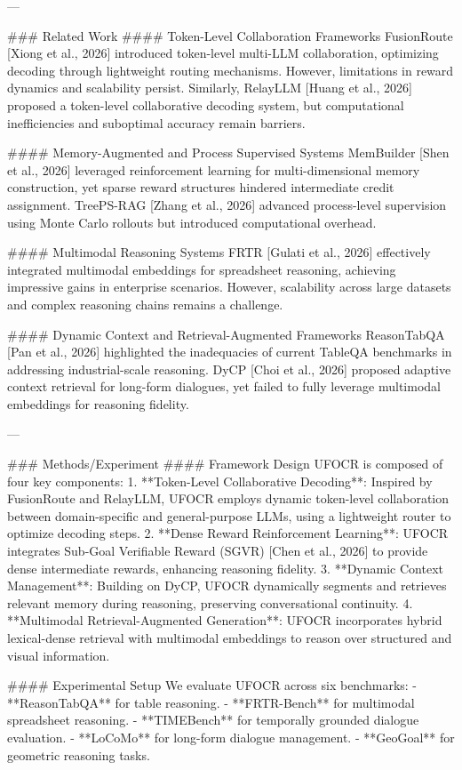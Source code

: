 ---

### Related Work
#### Token-Level Collaboration Frameworks
FusionRoute [Xiong et al., 2026] introduced token-level multi-LLM collaboration, optimizing decoding through lightweight routing mechanisms. However, limitations in reward dynamics and scalability persist. Similarly, RelayLLM [Huang et al., 2026] proposed a token-level collaborative decoding system, but computational inefficiencies and suboptimal accuracy remain barriers.

#### Memory-Augmented and Process Supervised Systems
MemBuilder [Shen et al., 2026] leveraged reinforcement learning for multi-dimensional memory construction, yet sparse reward structures hindered intermediate credit assignment. TreePS-RAG [Zhang et al., 2026] advanced process-level supervision using Monte Carlo rollouts but introduced computational overhead.

#### Multimodal Reasoning Systems
FRTR [Gulati et al., 2026] effectively integrated multimodal embeddings for spreadsheet reasoning, achieving impressive gains in enterprise scenarios. However, scalability across large datasets and complex reasoning chains remains a challenge.

#### Dynamic Context and Retrieval-Augmented Frameworks
ReasonTabQA [Pan et al., 2026] highlighted the inadequacies of current TableQA benchmarks in addressing industrial-scale reasoning. DyCP [Choi et al., 2026] proposed adaptive context retrieval for long-form dialogues, yet failed to fully leverage multimodal embeddings for reasoning fidelity.

---

### Methods/Experiment
#### Framework Design
UFOCR is composed of four key components:
1. **Token-Level Collaborative Decoding**: Inspired by FusionRoute and RelayLLM, UFOCR employs dynamic token-level collaboration between domain-specific and general-purpose LLMs, using a lightweight router to optimize decoding steps.
2. **Dense Reward Reinforcement Learning**: UFOCR integrates Sub-Goal Verifiable Reward (SGVR) [Chen et al., 2026] to provide dense intermediate rewards, enhancing reasoning fidelity.
3. **Dynamic Context Management**: Building on DyCP, UFOCR dynamically segments and retrieves relevant memory during reasoning, preserving conversational continuity.
4. **Multimodal Retrieval-Augmented Generation**: UFOCR incorporates hybrid lexical-dense retrieval with multimodal embeddings to reason over structured and visual information.

#### Experimental Setup
We evaluate UFOCR across six benchmarks:
- **ReasonTabQA** for table reasoning.
- **FRTR-Bench** for multimodal spreadsheet reasoning.
- **TIMEBench** for temporally grounded dialogue evaluation.
- **LoCoMo** for long-form dialogue management.
- **GeoGoal** for geometric reasoning tasks.

